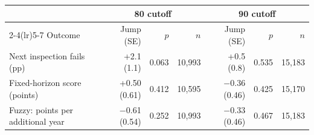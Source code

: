 \begin{tabular}{lrrrrrr}
\toprule
& \multicolumn{3}{c}{80 cutoff} & \multicolumn{3}{c}{90 cutoff} \\
\cmidrule(lr){2-4}\cmidrule(lr){5-7}
Outcome & Jump (SE) & $p$ & $n$ & Jump (SE) & $p$ & $n$ \\
\midrule
Next inspection fails (pp) & +2.1 (1.1) & 0.063 & 10,993 & +0.5 (0.8) & 0.535 & 15,183 \\
Fixed-horizon score (points) & +0.50 (0.61) & 0.412 & 10,595 & $-$0.36 (0.46) & 0.425 & 15,170 \\
Fuzzy: points per additional year & $-$0.61 (0.54) & 0.252 & 10,993 & $-$0.33 (0.46) & 0.467 & 15,183 \\
\bottomrule
\end{tabular}
